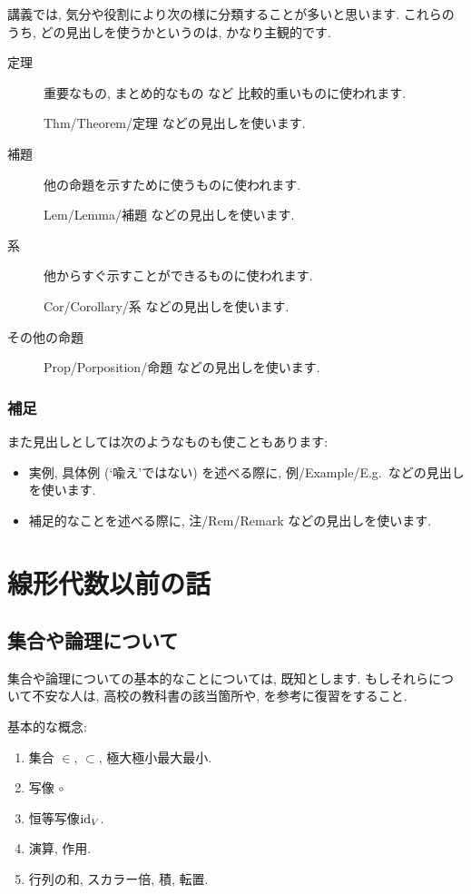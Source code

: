 講義では, 
気分や役割により次の様に分類することが多いと思います.
これらのうち, どの見出しを使うかというのは, 
かなり主観的です.
\begin{description}
\item[定理]
重要なもの, まとめ的なもの など 比較的重いものに使われます.

Thm/Theorem/定理  などの見出しを使います.

\item[補題]
他の命題を示すために使うものに使われます.

Lem/Lemma/補題  などの見出しを使います.

\item[系]
他からすぐ示すことができるものに使われます.

Cor/Corollary/系  などの見出しを使います.
\item[その他の命題]

Prop/Porposition/命題  などの見出しを使います.
\end{description}

\subsection{補足}
また見出しとしては次のようなものも使こともあります:
\begin{itemize}
 \item 
実例, 具体例 (`喩え'ではない) を述べる際に,
例/Example/E.g.\   などの見出しを使います.
\item
補足的なことを述べる際に,
注/Rem/Remark   などの見出しを使います.
\end{itemize}

\tableofcontents


\renewcommand{\thesection}{\originalthesection}
\mainmatter

\chapter{線形代数以前の話}


\section{集合や論理について}

集合や論理についての基本的なことについては,
既知とします.
もしそれらについて不安な人は,
高校の教科書の該当箇所や,
\cite{978-4-535-78682-0}
を参考に復習をすること.

基本的な概念:
\begin{enumerate}
  \item 集合 $\in$, $\subset$, 極大極小最大最小.
  \item 写像 $\circ$
  \item 恒等写像$\operatorname{id}_V$.
  \item 演算, 作用.
  \item 行列の和, スカラー倍, 積, 転置.
\end{enumerate}


